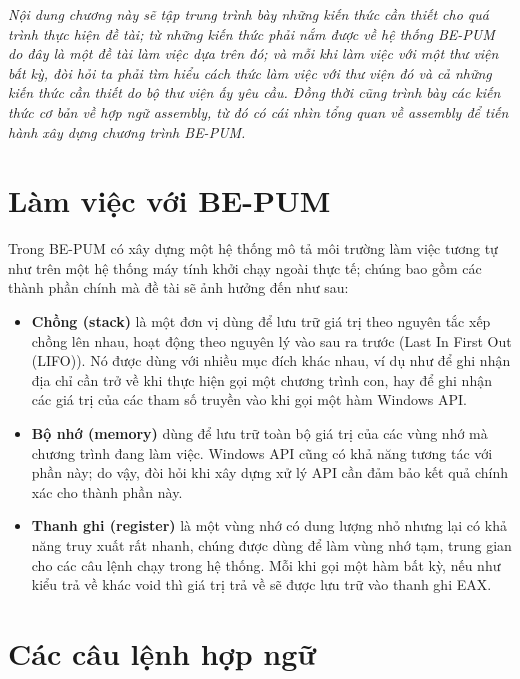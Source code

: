 
\begin{concept}[15cm]
\textit{Nội dung chương này sẽ tập trung trình bày những kiến thức cần thiết cho quá trình thực hiện đề tài; từ những kiến thức phải nắm được về hệ thống BE-PUM do đây là một đề tài làm việc dựa trên đó; và mỗi khi làm việc với một thư viện bất kỳ, đòi hỏi ta phải tìm hiểu cách thức làm việc với thư viện đó và cả những kiến thức cần thiết do bộ thư viện ấy yêu cầu. Đồng thời cũng trình bày các kiến thức cơ bản về hợp ngữ assembly, từ đó có cái nhìn tổng quan về assembly để tiến hành xây dựng chương trình BE-PUM.}
\end{concept}

\section{Làm việc với BE-PUM}

Trong BE-PUM có xây dựng một hệ thống mô tả môi trường làm việc tương tự như trên một hệ thống máy tính khởi chạy ngoài thực tế; chúng bao gồm các thành phần chính mà đề tài sẽ ảnh hưởng đến như sau:

\begin{itemize}
\item 	\textbf{Chồng (stack)} là một đơn vị dùng để lưu trữ giá trị theo nguyên tắc xếp chồng lên nhau, hoạt động theo nguyên lý vào sau ra trước (Last In First Out (LIFO)). Nó được dùng với nhiều mục đích khác nhau, ví dụ như để ghi nhận địa chỉ cần trở về khi thực hiện gọi một chương trình con, hay để ghi nhận các giá trị của các tham số truyền vào khi gọi một hàm Windows API.\\

\item 	\textbf{Bộ nhớ (memory)} dùng để lưu trữ toàn bộ giá trị của các vùng nhớ mà chương trình đang làm việc. Windows API cũng có khả năng tương tác với phần này; do vậy, đòi hỏi khi xây dựng xử lý API cần đảm bảo kết quả chính xác cho thành phần này.\\

\item 	\textbf{Thanh ghi (register)} là một vùng nhớ có dung lượng nhỏ nhưng lại có khả năng truy xuất rất nhanh, chúng được dùng để làm vùng nhớ tạm, trung gian cho các câu lệnh chạy trong hệ thống. Mỗi khi gọi một hàm bất kỳ, nếu như kiểu trả về khác void thì giá trị trả về sẽ được lưu trữ vào thanh ghi EAX.\\
\end{itemize}


\section{Các câu lệnh hợp ngữ}


